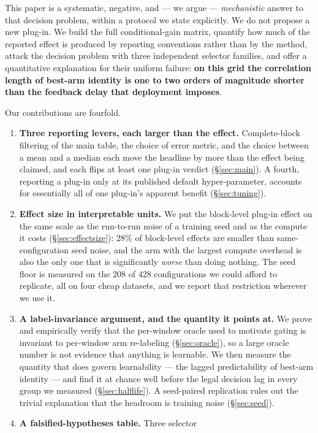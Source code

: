 \documentclass[a4paper,fleqn]{cas-sc}
\begin{document}
This paper is a systematic, negative, and --- we argue --- \emph{mechanistic}
answer to that decision problem, within a protocol we state explicitly. We do not
propose a new plug-in. We build the
full conditional-gain matrix, quantify how much of the reported effect is
produced by reporting conventions rather than by the method, attack the decision
problem with three independent selector families, and offer a quantitative
explanation for their uniform failure: \textbf{on this grid the correlation length of
best-arm identity is one to two orders of magnitude shorter than the feedback
delay that deployment imposes}.

Our contributions are fourfold.
\begin{enumerate}\itemsep2pt
\item \textbf{Three reporting levers, each larger than the effect.} Complete-block
filtering of the main table, the choice of error metric, and the choice between a
mean and a median each move the headline by more than the effect being claimed,
and each flips at least one plug-in verdict (\S\ref{sec:main}). A fourth,
reporting a plug-in only at its published default hyper-parameter, accounts for
essentially all of one plug-in's apparent benefit (\S\ref{sec:tuning}).
\item \textbf{Effect size in interpretable units.} We put the block-level
plug-in effect on the same scale as the run-to-run noise of a training seed and
as the compute it costs (\S\ref{sec:effectsize}): $28\%$ of block-level effects
are smaller than same-configuration seed noise, and the arm with the largest
compute overhead is also the only one that is significantly \emph{worse} than
doing nothing. The seed floor is measured on the $208$ of $428$ configurations we
could afford to replicate, all on four cheap datasets, and we report that
restriction wherever we use it.
\item \textbf{A label-invariance argument, and the quantity it points at.} We prove
and empirically verify
that the per-window oracle used to motivate gating is invariant to per-window
arm re-labeling (\S\ref{sec:oracle}), so a large oracle number is not evidence
that anything is learnable. We then measure the quantity that does
govern learnability --- the lagged predictability of best-arm identity --- and
find it at chance well before the legal decision lag in every group we measured
(\S\ref{sec:halflife}). A seed-paired replication rules out the trivial
explanation that the headroom is training noise (\S\ref{sec:seed}).
\item \textbf{A falsified-hypotheses table.} Three selector

\end{enumerate}
\end{document}
